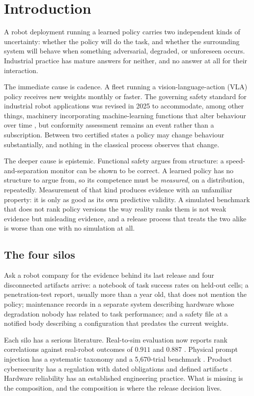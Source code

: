 \documentclass[11pt]{article}
\theoremstyle{definition}
\newcommand{\term}[1]{\emph{#1}}
\begin{document}
\section{Introduction}

A robot deployment running a learned policy carries two independent kinds of uncertainty:
whether the policy will do the task, and whether the surrounding system will behave when
something adversarial, degraded, or unforeseen occurs. Industrial practice has mature
answers for neither, and no answer at all for their interaction.

The immediate cause is cadence. A fleet running a vision-language-action (VLA) policy
receives new weights monthly or faster. The governing safety standard for industrial robot
applications was revised in 2025 to accommodate, among other things, machinery incorporating
machine-learning functions that alter behaviour over time
\citep{iso102181,iso102182}, but conformity assessment remains an event rather than a
subscription. Between two certified states a policy may change behaviour substantially, and
nothing in the classical process observes that change.

The deeper cause is epistemic. Functional safety argues from structure: a speed-and-separation
monitor can be shown to be correct. A learned policy has no structure to argue from, so its
competence must be \term{measured}, on a distribution, repeatedly. Measurement of that kind
produces evidence with an unfamiliar property: it is only as good as its own predictive
validity. A simulated benchmark that does not rank policy versions the way reality ranks
them is not weak evidence but misleading evidence, and a release process that treats the two
alike is worse than one with no simulation at all.

\subsection{The four silos}

Ask a robot company for the evidence behind its last release and four disconnected artifacts
arrive: a notebook of task success rates on held-out cells; a penetration-test report,
usually more than a year old, that does not mention the policy; maintenance records in a
separate system describing hardware whose degradation nobody has related to task
performance; and a safety file at a notified body describing a configuration that predates
the current weights.

Each silo has a serious literature. Real-to-sim evaluation now reports rank correlations
against real-robot outcomes of $0.911$ \citep{simfoundry} and $0.887$ \citep{robosnap}.
Physical prompt injection has a systematic taxonomy and a 5{,}670-trial benchmark
\citep{paperhijack}. Product cybersecurity has a regulation with dated obligations and
defined artifacts \citep{cra}. Hardware reliability has an established engineering practice.
What is missing is the composition, and the composition is where the release decision lives.
\end{document}

